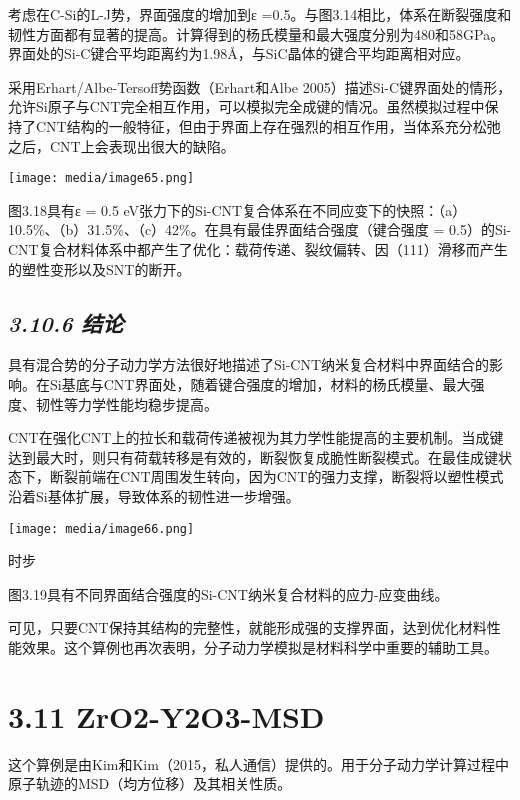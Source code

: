 \documentclass[
]{article}
\begin{document}
考虑在C-Si的L-J势，界面强度的增加到ε
=0.5。与图3.14相比，体系在断裂强度和韧性方面都有显著的提高。计算得到的杨氏模量和最大强度分别为480和58GPa。界面处的Si-C键合平均距离约为1.98Å，与SiC晶体的键合平均距离相对应。

采用Erhart/Albe-Tersoff势函数（Erhart和Albe
2005）描述Si-C键界面处的情形，允许Si原子与CNT完全相互作用，可以模拟完全成键的情况。虽然模拟过程中保持了CNT结构的一般特征，但由于界面上存在强烈的相互作用，当体系充分松弛之后，CNT上会表现出很大的缺陷。

\texttt{[image: media/image65.png]}

图3.18具有ε = 0.5
eV张力下的Si-CNT复合体系在不同应变下的快照：（a）10.5\%、（b）31.5\%、（c）42\%。在具有最佳界面结合强度（键合强度
=
0.5）的Si-CNT复合材料体系中都产生了优化：载荷传递、裂纹偏转、因（111）滑移而产生的塑性变形以及SNT的断开。

\hypertarget{ux7ed3ux8bba-2}{%
\subsection{\texorpdfstring{\emph{3.10.6
结论}}{3.10.6 结论}}\label{ux7ed3ux8bba-2}}

具有混合势的分子动力学方法很好地描述了Si-CNT纳米复合材料中界面结合的影响。在Si基底与CNT界面处，随着键合强度的增加，材料的杨氏模量、最大强度、韧性等力学性能均稳步提高。

CNT在强化CNT上的拉长和载荷传递被视为其力学性能提高的主要机制。当成键达到最大时，则只有荷载转移是有效的，断裂恢复成脆性断裂模式。在最佳成键状态下，断裂前端在CNT周围发生转向，因为CNT的强力支撑，断裂将以塑性模式沿着Si基体扩展，导致体系的韧性进一步增强。

\texttt{[image: media/image66.png]}

时步

图3.19具有不同界面结合强度的Si-CNT纳米复合材料的应力-应变曲线。

可见，只要CNT保持其结构的完整性，就能形成强的支撑界面，达到优化材料性能效果。这个算例也再次表明，分子动力学模拟是材料科学中重要的辅助工具。

\hypertarget{zro2-y2o3-msd}{%
\section{3.11 ZrO2-Y2O3-MSD}\label{zro2-y2o3-msd}}

这个算例是由Kim和Kim（2015，私人通信）提供的。用于分子动力学计算过程中原子轨迹的MSD（均方位移）及其相关性质。
\end{document}

